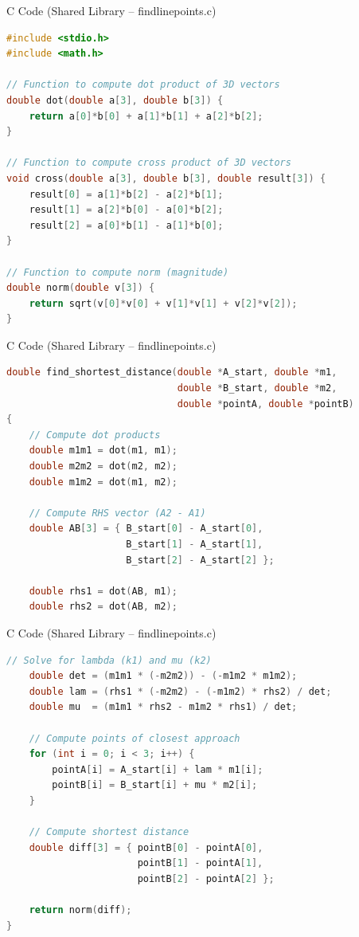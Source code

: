 \documentclass{beamer}
\begin{document}
\begin{frame}[fragile]{C Code (Shared Library – findlinepoints.c)}
\begin{lstlisting}[language=C]
#include <stdio.h>
#include <math.h>

// Function to compute dot product of 3D vectors
double dot(double a[3], double b[3]) {
    return a[0]*b[0] + a[1]*b[1] + a[2]*b[2];
}

// Function to compute cross product of 3D vectors
void cross(double a[3], double b[3], double result[3]) {
    result[0] = a[1]*b[2] - a[2]*b[1];
    result[1] = a[2]*b[0] - a[0]*b[2];
    result[2] = a[0]*b[1] - a[1]*b[0];
}

// Function to compute norm (magnitude)
double norm(double v[3]) {
    return sqrt(v[0]*v[0] + v[1]*v[1] + v[2]*v[2]);
}


\end{lstlisting}
\end{frame}

\begin{frame}[fragile]{C Code (Shared Library – findlinepoints.c)}
\begin{lstlisting}[language=C]
double find_shortest_distance(double *A_start, double *m1,
                              double *B_start, double *m2,
                              double *pointA, double *pointB)
{
    // Compute dot products
    double m1m1 = dot(m1, m1);
    double m2m2 = dot(m2, m2);
    double m1m2 = dot(m1, m2);

    // Compute RHS vector (A2 - A1)
    double AB[3] = { B_start[0] - A_start[0],
                     B_start[1] - A_start[1],
                     B_start[2] - A_start[2] };

    double rhs1 = dot(AB, m1);
    double rhs2 = dot(AB, m2);
\end{lstlisting}
\end{frame}

\begin{frame}[fragile]{C Code (Shared Library – findlinepoints.c)}
\begin{lstlisting}[language=C]
 // Solve for lambda (k1) and mu (k2)
    double det = (m1m1 * (-m2m2)) - (-m1m2 * m1m2);
    double lam = (rhs1 * (-m2m2) - (-m1m2) * rhs2) / det;
    double mu  = (m1m1 * rhs2 - m1m2 * rhs1) / det;

    // Compute points of closest approach
    for (int i = 0; i < 3; i++) {
        pointA[i] = A_start[i] + lam * m1[i];
        pointB[i] = B_start[i] + mu * m2[i];
    }

    // Compute shortest distance
    double diff[3] = { pointB[0] - pointA[0],
                       pointB[1] - pointA[1],
                       pointB[2] - pointA[2] };

    return norm(diff);
}
\end{lstlisting}
\end{frame}
\end{document}
